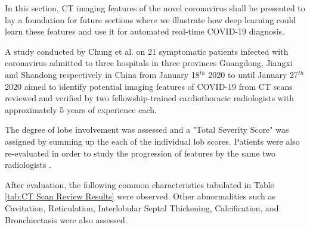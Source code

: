 In this section, CT imaging features of the novel coronavirus 
shall be presented to lay a foundation for future sections 
where we illustrate how deep learning could learn these features 
and use it for automated real-time COVID-19 diagnosis.

A study conducted by Chung et al. on 21 symptomatic  
patients infected with coronavirus admitted to three hospitals in 
three provinces Guangdong, Jiangxi 
and Shandong respectively in China from January 18$^{th}$ 2020 to 
until January 27$^{th}$ 2020 aimed to identify potential imaging 
features of COVID-19 from CT scans reviewed and verified by two fellowship-trained 
cardiothoracic radiologists with approximately 5 years of experience each.


The degree of lobe involvement was 
assessed and a "Total Severity Score" was assigned by summing up the each of the 
individual lob scores. Patients were also re-evaluated in order to study the 
progression of features by the same two radiologists \cite{CMA+2020}.

After evaluation, the following common characteristics tabulated in Table \ref{tab:CT Scan Review Results} were observed. Other abnormalities such as Cavitation, Reticulation, Interlobular Septal Thickening, Calcification, and Bronchiectasis were also assessed.


